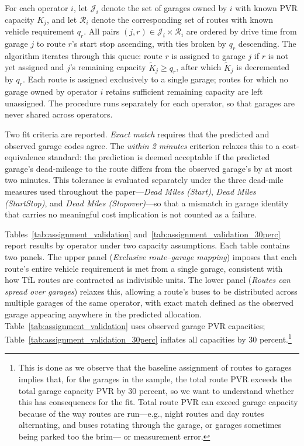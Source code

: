\documentclass[12pt]{article}
\begin{document}
For each operator $i$, let $\mathcal{J}_i$ denote the set of garages owned
by $i$ with known PVR capacity $K_j$, and let $\mathcal{R}_i$ denote the
corresponding set of routes with known vehicle requirement $q_r$. All pairs
$(j,r)\in\mathcal{J}_i\times\mathcal{R}_i$ are ordered by drive time from
garage $j$ to route $r$'s start stop ascending, with ties broken by $q_r$
descending. The algorithm iterates through this queue: route $r$ is assigned
to garage $j$ if $r$ is not yet assigned and $j$'s remaining capacity
$\tilde{K}_j\geq q_r$, after which $\tilde{K}_j$ is decremented by $q_r$.
Each route is assigned exclusively to a single garage; routes for which no
garage owned by operator $i$ retains sufficient remaining capacity are left
unassigned. The procedure runs separately for each operator, so that garages
are never shared across operators.
 
Two fit criteria are reported. \textit{Exact match} requires that the
predicted and observed garage codes agree. The \textit{within 2 minutes}
criterion relaxes this to a cost-equivalence standard: the prediction is
deemed acceptable if the predicted garage's dead-mileage to the route
differs from the observed garage's by at most two minutes. This tolerance
is evaluated separately under the three dead-mile measures used throughout
the paper---\emph{Dead Miles (Start)}, \emph{Dead Miles (StartStop)}, and
\emph{Dead Miles (Stopover)}---so that a mismatch in garage identity that
carries no meaningful cost implication is not counted as a failure.
 
Tables~\ref{tab:assignment_validation} and~\ref{tab:assignment_validation_30perc}
report results by operator under two capacity assumptions. Each table contains
two panels. The upper panel (\textit{Exclusive route--garage mapping}) imposes
that each route's entire vehicle requirement is met from a single garage,
consistent with how TfL routes are contracted as indivisible units. The lower
panel (\textit{Routes can spread over garages}) relaxes this, allowing a
route's buses to be distributed across multiple garages of the same operator,
with exact match defined as the observed garage appearing anywhere in the
predicted allocation. Table~\ref{tab:assignment_validation} uses observed
garage PVR capacities; Table~\ref{tab:assignment_validation_30perc} inflates
all capacities by 30 percent.\footnote{This is done as we observe that the baseline assignment of routes to garages implies that, for the garages in the sample, the total route PVR exceeds the total garage capacity PVR by 30 percent, so we want to understand whether this has consequences for the fit. Total route PVR can exceed garage capacity because of the way routes are run---e.g., night routes and day routes alternating, and buses rotating through the garage, or garages sometimes being parked too the brim--- or measurement error.}
 
\end{document}
